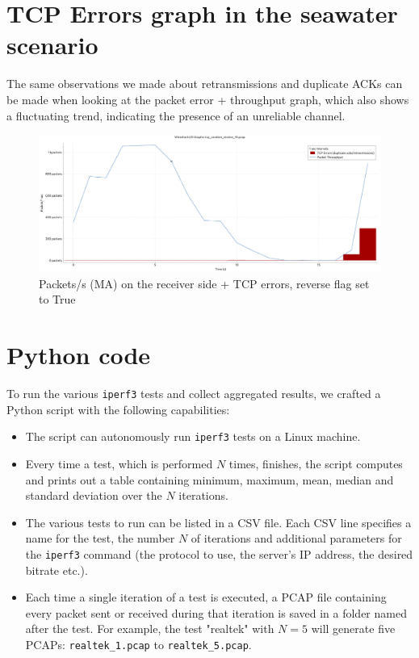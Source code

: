 \section{TCP Errors graph in the seawater scenario}
\label{graficoCiro}
The same observations we made about retransmissions and duplicate ACKs can be made when looking at the packet error + throughput graph, which also shows a fluctuating trend, indicating the presence of an unreliable channel.
\begin{figure}[H]
    \centering
    \includegraphics[width=0.75\linewidth]{images/PacketErrorsSaltWater.pdf}
    \caption{Packets/s (MA) on the receiver side + TCP errors, reverse flag set to True}
    \label{fig:enter-label}
\end{figure}

\onecolumn
\section{Python code}
\label{sec:python}

To run the various \texttt{iperf3} tests and collect aggregated results, we crafted a Python script with the following capabilities:

\begin{itemize}
    \item The script can autonomously run \texttt{iperf3} tests on a Linux machine.
    \item Every time a test, which is performed $N$ times, finishes, the script computes and prints out a table containing minimum, maximum, mean, median and standard deviation over the $N$ iterations.
    \item The various tests to run can be listed in a CSV file. Each CSV line specifies a name for the test, the number $N$ of iterations and additional parameters for the \texttt{iperf3} command (the protocol to use, the server's IP address, the desired bitrate etc.).
    \item Each time a single iteration of a test is executed, a PCAP file containing every packet sent or received during that iteration is saved in a folder named after the test.  
    For example, the test "realtek" with $N=5$ will generate five PCAPs:  
    \texttt{realtek\_1.pcap} to \texttt{realtek\_5.pcap}.
\end{itemize}

